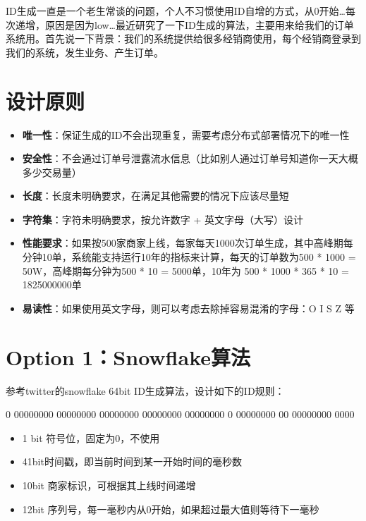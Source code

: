 \documentclass[12pt]{article}
\begin{document}
\makeblogtitle

ID生成一直是一个老生常谈的问题，个人不习惯使用ID自增的方式，从0开始\ldots 每次递增，原因是因为low\ldots 最近研究了一下ID生成的算法，主要用来给我们的订单系统用。首先说一下背景：我们的系统提供给很多经销商使用，每个经销商登录到我们的系统，发生业务、产生订单。

\section{设计原则}\label{ux8bbeux8ba1ux539fux5219}

\begin{itemize}
\tightlist
\item
  \textbf{唯一性}：保证生成的ID不会出现重复，需要考虑分布式部署情况下的唯一性
\item
  \textbf{安全性}：不会通过订单号泄露流水信息（比如别人通过订单号知道你一天大概多少交易量）
\item
  \textbf{长度}：长度未明确要求，在满足其他需要的情况下应该尽量短
\item
  \textbf{字符集}：字符未明确要求，按允许数字 + 英文字母（大写）设计
\item
  \textbf{性能要求}：如果按500家商家上线，每家每天1000次订单生成，其中高峰期每分钟10单，系统能支持运行10年的指标来计算，每天的订单数为500 * 1000 = 50W，高峰期每分钟为500 * 10 = 5000单，10年为 500 * 1000 * 365 * 10 = 1825000000单
\item
  \textbf{易读性}：如果使用英文字母，则可以考虑去除掉容易混淆的字母：O I S Z 等
\end{itemize}

\section{Option 1：Snowflake算法}\label{option-1snowflakeux7b97ux6cd5}

参考twitter的snowflake 64bit ID生成算法，设计如下的ID规则：

0 00000000 00000000 00000000 00000000 00000000 0 00000000 00 00000000 0000

\begin{itemize}
\tightlist
\item
  1 bit 符号位，固定为0，不使用
\item
  41bit时间戳，即当前时间到某一开始时间的毫秒数
\item
  10bit 商家标识，可根据其上线时间递增
\item
  12bit 序列号，每一毫秒内从0开始，如果超过最大值则等待下一毫秒
\end{itemize}
\end{document}
